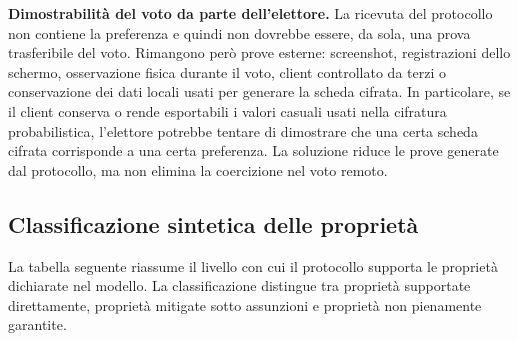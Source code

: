 \documentclass[a4paper,12pt]{article}
\begin{document}
\textbf{Dimostrabilità del voto da parte dell'elettore.}
La ricevuta del protocollo non contiene la preferenza e quindi non dovrebbe essere, da sola, una prova trasferibile del voto. Rimangono però prove esterne: screenshot, registrazioni dello schermo, osservazione fisica durante il voto, client controllato da terzi o conservazione dei dati locali usati per generare la scheda cifrata. In particolare, se il client conserva o rende esportabili i valori casuali usati nella cifratura probabilistica, l'elettore potrebbe tentare di dimostrare che una certa scheda cifrata corrisponde a una certa preferenza. La soluzione riduce le prove generate dal protocollo, ma non elimina la coercizione nel voto remoto.

\subsection{Classificazione sintetica delle proprietà}

La tabella seguente riassume il livello con cui il protocollo supporta le proprietà dichiarate nel modello.
La classificazione distingue tra proprietà supportate direttamente, proprietà mitigate sotto assunzioni e proprietà non pienamente garantite.
\end{document}

